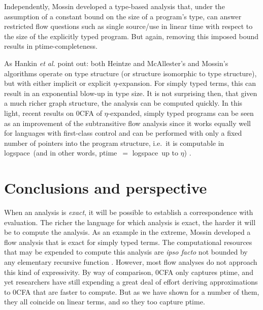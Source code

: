\documentclass{llncs}
\newcommand\ptime{{\sc ptime}}
\newcommand\logspace{{\sc logspace}}
\begin{document}
Independently, Mossin \cite{mossin-98} developed a type-based analysis
that, under the assumption of a constant bound on the size of a
program's type, can answer restricted flow questions such as single
source/use in linear time with respect to the size of the explicitly
typed program.  But again, removing this imposed bound results in
\ptime-completeness.

As Hankin {\em et al.} \cite{hankin-games} point out: both Heintze
and McAllester's and Mossin's algorithms operate on type structure (or
structure isomorphic to type structure), but with either implicit or
explicit $\eta$-expansion.  For simply typed terms, this can result in
an exponential blow-up in type size.  It is not surprising then, that
given a much richer graph structure, the analysis can be computed
quickly.  In this light, recent results on 0CFA of $\eta$-expanded,
simply typed programs can be seen as an improvement of the
subtransitive flow analysis since it works equally well for languages
with first-class control and can be performed with only a fixed number
of pointers into the program structure, i.e.~it is computable in
\logspace\ (and in other words, \ptime\ $=$
\logspace\ up to $\eta$) \cite{vanhorn-mairson-07}.






\section{Conclusions and perspective}



When an analysis is {\em exact}, it will be possible to establish a
correspondence with evaluation.  The richer the language for which
analysis is exact, the harder it will be to compute the analysis.  As
an example in the extreme, Mossin \cite{mossin-97} developed a flow
analysis that is exact for simply typed terms.  The computational
resources that may be expended to compute this analysis are {\em ipso
facto} not bounded by any elementary recursive function
\cite{statman}.  However, most flow analyses do not approach this kind
of expressivity.  By way of comparison, 0CFA only captures \ptime, and
yet researchers have still expending a great deal of effort deriving
approximations to 0CFA that are faster to compute.  But as we have
shown for a number of them, they all coincide on linear terms, and so
they too capture \ptime.
\end{document}
